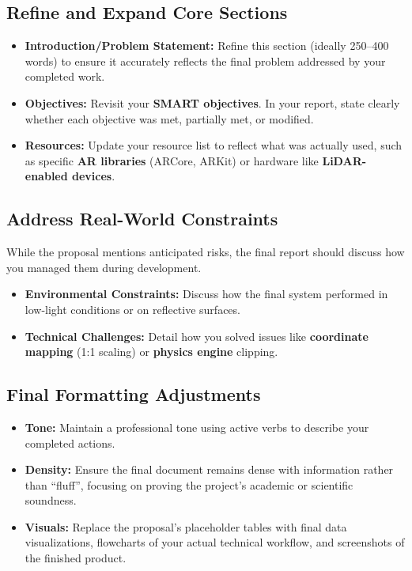 \documentclass{tietreport}
\begin{document}
\subsection{Refine and Expand Core Sections}

\begin{itemize}
\item \textbf{Introduction/Problem Statement:} Refine
  this section (ideally 250--400 words) to ensure it
  accurately reflects the final problem addressed by
  your completed work.
\item \textbf{Objectives:} Revisit your \textbf{SMART
    objectives}. In your report, state clearly whether
  each objective was met, partially met, or modified.
\item \textbf{Resources:} Update your resource list to
  reflect what was actually used, such as specific
  \textbf{AR libraries} (ARCore, ARKit) or hardware
  like \textbf{LiDAR-enabled devices}.
\end{itemize}

\subsection{Address Real-World Constraints}

While the proposal mentions anticipated risks,
the final report should discuss how you managed
them during development.

\begin{itemize}
\item \textbf{Environmental Constraints:} Discuss how
  the final system performed in low-light conditions or
  on reflective surfaces.
\item \textbf{Technical Challenges:} Detail how you
  solved issues like \textbf{coordinate mapping} (1:1
  scaling) or \textbf{physics engine} clipping.
\end{itemize}

\subsection{Final Formatting Adjustments}

\begin{itemize}
\item \textbf{Tone:} Maintain a professional tone using
  active verbs to describe your completed actions.
\item \textbf{Density:} Ensure the final document
  remains dense with information rather than ``fluff'',
  focusing on proving the project's academic or
  scientific soundness.
\item \textbf{Visuals:} Replace the proposal's
  placeholder tables with final data visualizations,
  flowcharts of your actual technical workflow, and
  screenshots of the finished product.
\end{itemize}
\end{document}
